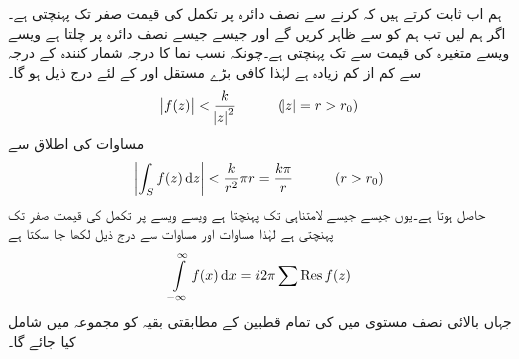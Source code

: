 ہم اب ثابت کرتے ہیں کہ  کرنے سے نصف دائرہ  پر تکمل کی قیمت صفر تک پہنچتی ہے۔اگر ہم  لیں تب ہم  کو  سے ظاہر کریں گے اور جیسے جیسے  نصف دائرہ  پر چلتا ہے ویسے ویسے  متغیرہ  کی قیمت  سے  تک پہنچتی ہے۔چونکہ نسب نما کا درجہ شمار کنندہ کے درجہ سے کم از کم  زیادہ ہے لہٰذا کافی بڑے مستقل  اور  کے لئے درج ذیل ہو گا۔
\begin{align*}
\abs{f(z)}<\frac{k}{\abs{z}^2}\quad \quad \quad (\abs{z}=r>r_0)
\end{align*}
مساوات  کی اطلاق سے 
\begin{align*}
\abs{\int_S f(z)\dif z}<\frac{k}{r^2}\pi r=\frac{k\pi}{r}\quad \quad \quad (r>r_0)
\end{align*}
حاصل ہوتا ہے۔یوں  جیسے جیسے  لامتناہی تک پہنچتا ہے ویسے ویسے  پر تکمل کی قیمت  صفر تک پہنچتی ہے  لہٰذا مساوات  اور  مساوات  سے درج ذیل لکھا جا سکتا ہے
\begin{align}\label{مساوات_بقیہ_غیر-مناسب_تکمل}
\int\limits_{-\infty}^{\infty} f(x)\dif x=i2\pi\sum\Res f(z)
\end{align}
جہاں بالائی نصف مستوی میں  کی تمام قطبین کے مطابقتی بقیہ کو مجموعہ میں شامل کیا جائے گا۔

